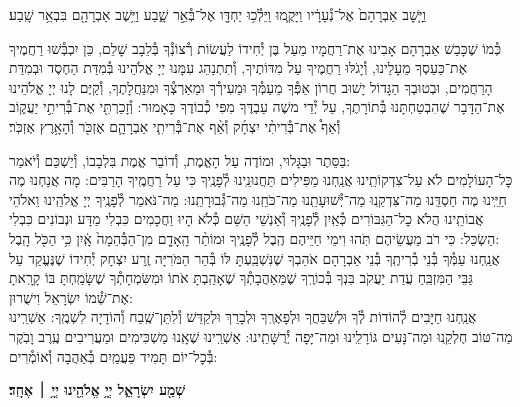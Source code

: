 \documentclass[twoside, openany, parskip=half, 11pt]{book}
\begin{document}
וַיָּ֤שׇׁב אַבְרָהָם֙ אֶל־נְ֯עָרָ֔יו וַיָּקֻ֛מוּ וַיֵּלְ֯כ֥וּ יַחְדָּ֖ו אֶל־בְּ֯אֵ֣ר שָׁ֑בַע וַיֵּ֥שֶׁב אַבְרָהָ֖ם בִּבְאֵ֥ר שָֽׁבַע׃

כְּ֯מוֹ שֶׁכָּבַשׁ אַבְרָהָם אָבִינוּ אֶת־רַחֲמָיו מֵעַל בֶּן יְ֯חִידוֹ לַעֲשׂוֹת רְ֯צוֹנְ֯ךָ בְּ֯לֵבָב שָׁלֵם, כֵּן יִכְבְּ֯שׁוּ רַחֲמֶיךָ אֶת־כַּעַסְךָ מֵעָלֵינוּ, וְ֯יָגֹלּוּ רַחֲמֶיךָ עַל מִדּוֹתֶיךָ, וְ֯תִתְנַהֵג עִמָּנוּ יְיָ אֱלֹהֵינוּ בְּ֯מִדַּת הַחֶסֶד וּבְמִדַּת הָרַחֲמִים, וּבְטוּבְךָ הַגָּדוֹל יָשׁוּב חֲרוֹן אַפְּ֯ךָ מֵעַמְּ֯ךָ וּמֵעִירְ֯ךָ וּמֵאַרְצְ֯ךָ וּמִנַּחֲלָתֶךָ, וְ֯קַיֶּם לָנוּ יְיָ אֱלֹהֵינוּ אֶת־הַדָּבָר שֶׁהִבְטַחְתָּנוּ בְּ֯תוֹרָתֶךָ, עַל יְ֯דֵי משֶׁה עַבְדֶּךָ מִפִּי כְ֯בוֹדֶךָ כָּאָמוּר: וְ֯זָכַרְתִּ֖י אֶת־בְּ֯רִיתִ֣י יַעֲק֑וֹב וְ֯אַף֩ אֶת־בְּ֯רִיתִ֨י יִצְחָ֜ק וְ֯אַ֨ף אֶת־בְּ֯רִיתִ֧י אַבְרָהָ֛ם אֶזְכֹּ֖ר וְ֯הָאָ֥רֶץ אֶזְכֹּֽר׃

בַּסֵּתֶר וּבַגָּלוּי, וּמוֹדֶה עַל הָאֱמֶת, וְ֯דוֹבֵר אֱמֶת בִּלְבָבוֹ, וְ֯יַשְׁכֵּם וְ֯יֹאמַר: \\
כׇּל־הָעוֹלָמִים לֹא עַל־צִדְקוֹתֵֽינוּ אֲנַֽחְנוּ מַפִּילִים תַּחֲנוּנֵֽינוּ לְ֯פָנֶֽיךָ כִּי עַל רַחֲמֶֽיךָ הָרַבִּים: מָה אֲנַחְנוּ מֶה חַיֵּֽינוּ מֶה חַסְדֵּֽנוּ מַה־צִּדְקֵֽנוּ מַה־יְּ֯שׁוּעָתֵֽנוּ מַה־כֹּחֵֽנוּ מַה־גְּ֯בוּרָתֵֽנוּ: מַה־נֹּאמַר לְ֯פָנֶֽיךָ יְיָ אֱלֹהֵֽינוּ וֵאלֹהֵי אֲבוֹתֵֽינוּ הֲלֹא כׇל־הַגִּבּוֹרִים כְּ֯אַֽיִן לְ֯פָנֶֽיךָ וְ֯אַנְשֵׁי הַשֵּׁם כְּ֯לֹא הָיוּ וַחֲכָמִים כִּבְלִי מַדָּע וּנְבוֹנִים כִּבְלִי הַשְׂכֵּל: כִּי רֹב מַעֲשֵׂיהֶם תֹּֽהוּ וִימֵי חַיֵּיהֶם הֶֽבֶל לְ֯פָנֶֽיךָ וּמוֹתַ֨ר הָֽאָדָ֤ם מִן־הַבְּ֯הֵמָה֙ אָֽ֔יִן כִּ֥י הַכֹּ֖ל הָֽבֶל: \\
אֲנַֽחְנוּ עַמְּ֯ךָ בְּ֯נֵי בְ֯רִיתֶֽךָ בְּ֯נֵי אַבְרָהָם אֹהַבְךָ שֶׁנִּשְׁבַּֽעְתָּ לּוֹ בְּ֯הַר הַמֹּרִיָּה זֶֽרַע יִצְחָק יְ֯חִידוֹ שֶׁנֶּעֱקַד עַל גַּבֵּי הַמִּזְבֵּֽחַ עֲדַת יַעֲקֹב בִּנְךָ בְּ֯כוֹרֶֽךָ שֶׁמֵּאַהֲבָתְ֯ךָ שֶׁאָהַֽבְתָּ אֹתוֹ וּמִשִּׂמְחָתְ֯ךָ שֶׁשָּׂמַֽחְתָּ בּוֹ קָרָֽאתָ אֶת־שְׁ֯מוֹ יִשְׂרָאֵל וִישֻׁרוּן: \\
אֲנַֽחְנוּ חַיָּבִים לְ֯הוֹדוֹת לְ֯ךָ וּלְשַׁבֵּחֲךָ וּלְפָאֶרְֽךָ וּלְבָרֵךְ וּלְקַדֵּשׁ וְ֯לִתֵּן־שֶֽׁבַח וְ֯הוֹדָיָה לִשְׁמֶֽךָ: אַשְׁרֵֽינוּ מַה־טּוֹב חֶלְקֵֽנוּ וּמַה־נָּעִים גּוֹרָלֵֽינוּ וּמַה־יָּפָה יְ֯רֻשָּׁתֵֽינוּ: אַשְׁרֵֽינוּ שֶׁאָֽנוּ מַשְׁכִּימִים וּמַעֲרִיבִים עֶֽרֶב וָבֹֽקֶר בְּ֯כׇל־יוֹם תָּמִיד פַּעֲמַֽיִם בְּ֯אַהֲבָה וְ֯אוֹמְ֯רִים:

\begin{Large}
\textbf{שְׁמַ֖ע יִשְׂרָאֵ֑ל יְיָ֥ אֱלֹהֵ֖ינוּ יְיָ֥ ׀ אֶחָֽד׃}
\end{Large}
\end{document}
